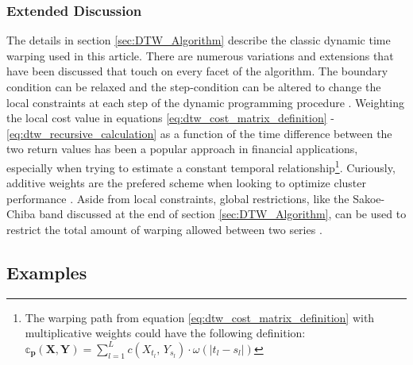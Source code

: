 \documentclass[12pt]{article}
\begin{document}
\subsubsection{Extended Discussion}

The details in section \ref{sec:DTW_Algorithm} describe the classic dynamic time warping used in this article. There are numerous variations and extensions that have been discussed that touch on every facet of the algorithm. The boundary condition can be relaxed and the step-condition can be altered to change the local constraints at each step of the dynamic programming procedure \parencite{SakoeChiba_IEEE_1978}. Weighting the local cost value in equations \ref{eq:dtw_cost_matrix_definition} - \ref{eq:dtw_recursive_calculation} as a function of the time difference between the two return values has been a popular approach in financial applications, especially when trying to estimate a constant temporal relationship\footnote{The warping path from equation \ref{eq:dtw_cost_matrix_definition} with multiplicative weights could have the following definition: $\mathbb{c}_{\boldsymbol{p}}(\boldsymbol{X}, \boldsymbol{Y}) = \sum^{L}_{l=1} c(X_{t_{l}},\, Y_{s_{l}}) \cdot \omega(|t_{l} - s_{l}|)$}. Curiously, additive weights are the prefered scheme when looking to optimize cluster performance \parencite{PETITJEAN2011678, Petitjean_et_al_2016}. Aside from local constraints, global restrictions, like the Sakoe-Chiba band discussed at the end of section \ref{sec:DTW_Algorithm}, can be used to restrict the total amount of warping allowed between two series \parencite{Itakura_1975, SakoeChiba_IEEE_1978, Mueller2007}. 

\subsection{Examples}
\end{document}
